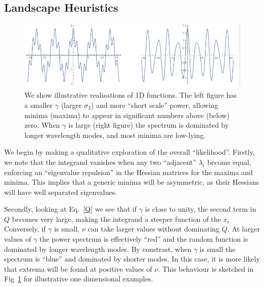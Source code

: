 \documentclass[12pt]{article}
\begin{document}



\subsection{Landscape Heuristics}

\begin{figure}
  \centering
  
  \includegraphics[width=\linewidth]{TwoSigmas.png}
  \caption{We show illustrative realisations of 1D functions. The left figure has a smaller $\gamma$ (larger $\sigma_2$) and more “short scale” power, allowing minima (maxima) to appear in significant numbers above (below) zero. When $\gamma$ is large (right figure) the spectrum is dominated by longer wavelength modes, and most minima are low-lying.}
  \label{examples1}
\end{figure}

We begin by making a qualitative exploration of the overall ``likelihood''. Firstly, we note that the integrand vanishes when any two ``adjacent'' $\lambda_i$ become equal, enforcing an ``eigenvalue repulsion'' in the Hessian matrices for the maxima and minima. This implies that a generic minima will be asymmetric, as their Hessians will have well separated eigenvalues.   

Secondly,  looking at Eq.~\ref{Q} we see that if $\gamma$ is close to unity,  the second term in $Q$ becomes very large, making the integrand a steeper function of the $x_i$ Conversely, if   $\gamma$ is small, $\nu$ can take larger values without dominating $Q$.  At larger values of $\gamma$ the power spectrum is effectively ``red'' and the random function is dominated by longer wavelength modes. By constrast, when $\gamma$ is small the spectrum is ``blue'' and dominated by shorter modes. In this case, it is more likely that extrema will be found at positive values of $\nu$. This behaviour is sketched in Fig~\ref{examples1} for illustrative one dimensional examples. 
\end{document}
